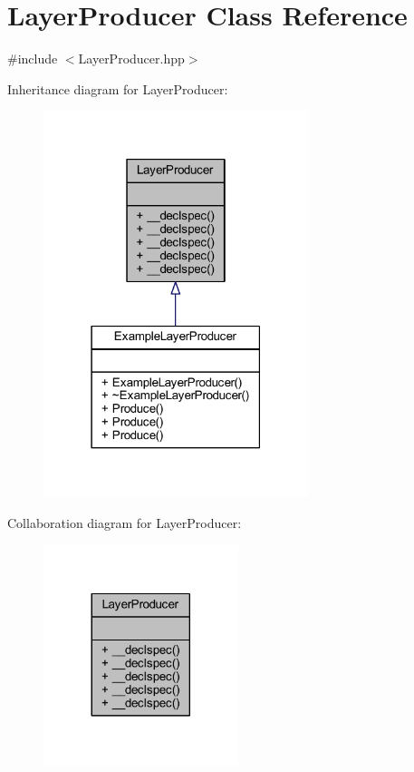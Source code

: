 \hypertarget{class_layer_producer}{\section{Layer\-Producer Class Reference}
\label{class_layer_producer}
}


{\ttfamily \#include $<$Layer\-Producer.\-hpp$>$}



Inheritance diagram for Layer\-Producer\-:\nopagebreak
\begin{figure}[H]
\begin{center}
\leavevmode
\includegraphics[width=219pt]{class_layer_producer__inherit__graph}
\end{center}
\end{figure}


Collaboration diagram for Layer\-Producer\-:\nopagebreak
\begin{figure}[H]
\begin{center}
\leavevmode
\includegraphics[width=161pt]{class_layer_producer__coll__graph}
\end{center}
\end{figure}

